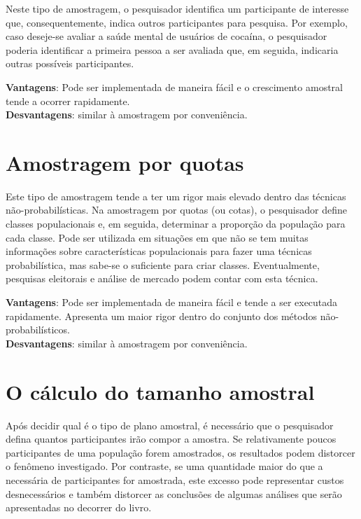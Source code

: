\documentclass[
]{book}
\begin{document}
Neste tipo de amostragem, o pesquisador identifica um participante de interesse que, consequentemente, indica outros participantes para pesquisa. Por exemplo, caso deseje-se avaliar a saúde mental de usuários de cocaína, o pesquisador poderia identificar a primeira pessoa a ser avaliada que, em seguida, indicaria outras possíveis participantes.

\textbf{Vantagens}: Pode ser implementada de maneira fácil e o crescimento amostral tende a ocorrer rapidamente.\\
\textbf{Desvantagens}: similar à amostragem por conveniência.

\hypertarget{amostragem-por-quotas}{%
\section{Amostragem por quotas}\label{amostragem-por-quotas}}

Este tipo de amostragem tende a ter um rigor mais elevado dentro das técnicas não-probabilísticas. Na amostragem por quotas (ou cotas), o pesquisador define classes populacionais e, em seguida, determinar a proporção da população para cada classe. Pode ser utilizada em situações em que não se tem muitas informações sobre características populacionais para fazer uma técnicas probabilística, mas sabe-se o suficiente para criar classes. Eventualmente, pesquisas eleitorais e análise de mercado podem contar com esta técnica.

\textbf{Vantagens}: Pode ser implementada de maneira fácil e tende a ser executada rapidamente. Apresenta um maior rigor dentro do conjunto dos métodos não-probabilísticos.\\
\textbf{Desvantagens}: similar à amostragem por conveniência.

\hypertarget{o-cuxe1lculo-do-tamanho-amostral}{%
\section{O cálculo do tamanho amostral}\label{o-cuxe1lculo-do-tamanho-amostral}}

Após decidir qual é o tipo de plano amostral, é necessário que o pesquisador defina quantos participantes irão compor a amostra. Se relativamente poucos participantes de uma população forem amostrados, os resultados podem distorcer o fenômeno investigado. Por contraste, se uma quantidade maior do que a necessária de participantes for amostrada, este excesso pode representar custos desnecessários e também distorcer as conclusões de algumas análises que serão apresentadas no decorrer do livro.
\end{document}
